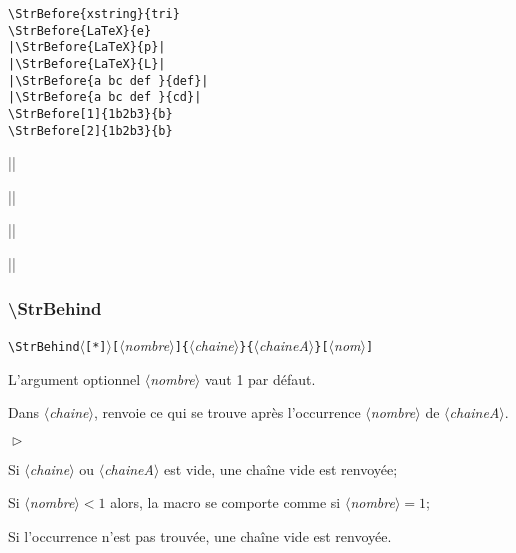 \documentclass[a4paper,10pt]{article}
\newcommand\argu[1]{$\langle$\textit{#1}$\rangle$}
\newcommand\ARGU[1]{\texttt{\color{black}\{}\argu{#1}\texttt{\color{black}\}}}
\newcommand\arguC[1]{\texttt{\color{black}[}\argu{#1}\texttt{\color{black}]}}
\newcommand\etoile{$\langle$\texttt{[*]}$\rangle$}
\newenvironment{Conditions}[1][1cm]%
{\begin{list}%
	{$\vartriangleright$}%
	{\setlength{\leftmargin}{#1}
	 \setlength{\itemsep}{0pt}
	 \setlength{\parsep}{0pt}
	 \setlength{\topsep}{2ptplus3ptminus2pt}
	}}%
{\end{list}}
\newcommand\styleexemple{\small\vskip4pt}
\newcommand\verbinline{\lstinline[basicstyle=\normalsize\ttfamily]}
\begin{document}
\begin{minipage}[t]{0.65\linewidth}
\begin{lstlisting}
\StrBefore{xstring}{tri}
\StrBefore{LaTeX}{e}
|\StrBefore{LaTeX}{p}|
|\StrBefore{LaTeX}{L}|
|\StrBefore{a bc def }{def}|
|\StrBefore{a bc def }{cd}|
\StrBefore[1]{1b2b3}{b}
\StrBefore[2]{1b2b3}{b}
\end{lstlisting}%
\end{minipage}\hfill
\begin{minipage}[t]{0.35\linewidth}
	\styleexemple
	\par
	\par
	||\par
	||\par
	||\par
	||\par
	\par
\end{minipage}%

\subsubsection{\ttfamily\textbackslash StrBehind}
\verbinline|\StrBehind|\etoile\arguC{nombre}\ARGU{chaine}\ARGU{chaineA}\arguC{nom}
\smallskip

L'argument optionnel \argu{nombre} vaut 1 par défaut.\par\nobreak\smallskip
Dans \argu{chaine}, renvoie ce qui se trouve après l'occurrence \no\argu{nombre} de \argu{chaineA}.\medskip

\begin{Conditions}
	\item Si \argu{chaine} ou \argu{chaineA} est vide, une chaîne vide est renvoyée;
	\item Si \argu{nombre}${}<1$ alors, la macro se comporte comme si \argu{nombre}${}=1$;
	\item Si l'occurrence n'est pas trouvée, une chaîne vide est renvoyée.
\end{Conditions}
\end{document}
